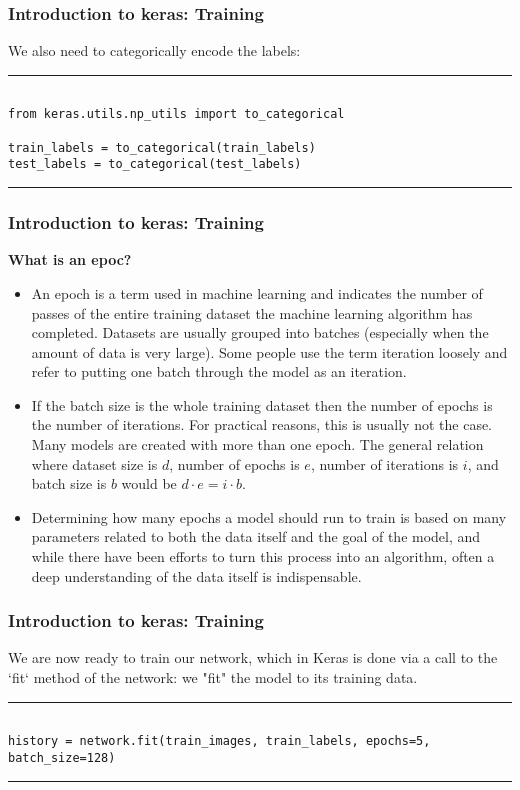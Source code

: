 \documentclass[11pt]{beamer}
\begin{document}
\begin{frame}[fragile]
\frametitle{Introduction to keras: Training}

We also need to categorically encode the labels:

\rule{\textwidth}{1pt}
\scriptsize
\begin{verbatim}

from keras.utils.np_utils import to_categorical

train_labels = to_categorical(train_labels)
test_labels = to_categorical(test_labels)

\end{verbatim}
\rule{\textwidth}{1pt}
\end{frame}
\begin{frame}[fragile]
\frametitle{Introduction to keras: Training}
\textbf{What is an epoc?}
\footnotesize
	\begin{itemize}
	\item 
An epoch is a term used in machine learning and indicates the number of passes of the entire training dataset the machine learning algorithm has completed. Datasets are usually grouped into batches (especially when the amount of data is very large). Some people use the term iteration loosely and refer to putting one batch through the model as an iteration.   
\item
If the batch size is the whole training dataset then the number of epochs is the number of iterations. For practical reasons, this is usually not the case. Many models are created with more than one epoch. The general relation where dataset size is $d$, number of epochs is $e$, number of iterations is $i$, and batch size is $b$ would be $d \cdot e = i \cdot b$. 
\item 
Determining how many epochs a model should run to train is based on many parameters related to both the data itself and the goal of the model, and while there have been efforts to turn this process into an algorithm, often a deep understanding of the data itself is indispensable.

	\end{itemize}
\end{frame}
\begin{frame}[fragile]
\frametitle{Introduction to keras: Training}
We are now ready to train our network, which in Keras is done via a call to the `fit` method of the network: we "fit" the model to its training data.
\vspace{0.5cm}
\scriptsize
\rule{\textwidth}{1pt}
\begin{verbatim}

history = network.fit(train_images, train_labels, epochs=5, batch_size=128)

\end{verbatim}
\rule{\textwidth}{1pt}
\end{frame}
\end{document}
